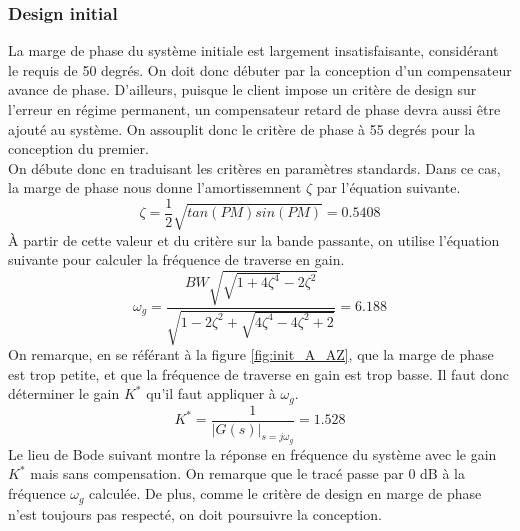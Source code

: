 \documentclass{udes_rapport} %
\begin{document}
\subsubsection{Design initial}
La marge de phase du système initiale est largement insatisfaisante, considérant le requis de 50 degrés. On doit donc débuter par la conception d'un compensateur avance de phase. D'ailleurs, puisque le client impose un critère de design sur l'erreur en régime permanent, un compensateur retard de phase devra aussi être ajouté au système. On assouplit donc le critère de phase à 55 degrés pour la conception du premier.\\
On débute donc en traduisant les critères en paramètres standards. Dans ce cas, la marge de phase nous donne l'amortissemnent $\zeta$ par l'équation suivante.
\[ \zeta =  \frac{1}{2}\sqrt{tan(PM)sin(PM)} = 0.5408\]
À partir de cette valeur et du critère sur la bande passante, on utilise l'équation suivante pour calculer la fréquence de traverse en gain.
\[ \omega_g =  \frac{BW\sqrt{\sqrt{1+4\zeta^4}-2\zeta^2}}{\sqrt{1-2\zeta^2+\sqrt{4\zeta^4-4\zeta^2+2}}} = 6.188\]
On remarque, en se référant à la figure \ref{fig:init_A_AZ}, que la marge de phase est trop petite, et que la fréquence de traverse en gain est trop basse. Il faut donc déterminer le gain $K^*$ qu'il faut appliquer à $\omega_g$.
\[K^* = \frac{1}{|G(s)|_{s=j\omega_g}} = 1.528\]
Le lieu de Bode suivant montre la réponse en fréquence du système avec le gain $K^*$ mais sans compensation. On remarque que le tracé passe par 0 dB à la fréquence $\omega_g$ calculée. De plus, comme le critère de design en marge de phase n'est toujours pas respecté, on doit poursuivre la conception.

\end{document}
